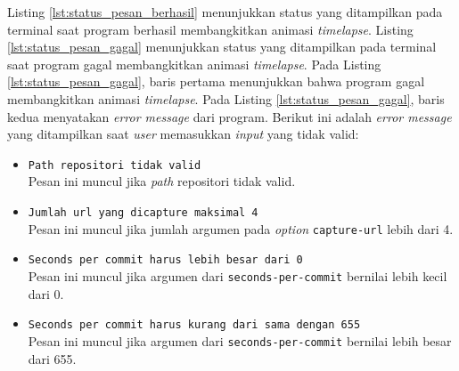 Listing \ref{lst:status_pesan_berhasil} menunjukkan status yang ditampilkan pada terminal saat program berhasil membangkitkan animasi \textit{timelapse}. Listing \ref{lst:status_pesan_gagal} menunjukkan status yang ditampilkan pada terminal saat program gagal membangkitkan animasi \textit{timelapse}. Pada Listing \ref{lst:status_pesan_gagal}, baris pertama menunjukkan bahwa program gagal membangkitkan animasi \textit{timelapse}. Pada Listing \ref{lst:status_pesan_gagal}, baris kedua menyatakan \textit{error message} dari program. Berikut ini adalah \textit{error message} yang ditampilkan saat \textit{user} memasukkan \textit{input} yang tidak valid:
\begin{itemize}
\item \texttt{Path repositori tidak valid}\\
Pesan ini muncul jika \textit{path} repositori tidak valid.
\item \texttt{Jumlah url yang dicapture maksimal 4}\\
Pesan ini muncul jika jumlah argumen pada \textit{option} \texttt{capture-url} lebih dari 4.
\item \texttt{Seconds per commit harus lebih besar dari 0}\\
Pesan ini muncul jika argumen dari \texttt{seconds-per-commit} bernilai lebih kecil dari 0.

\item \texttt{Seconds per commit harus kurang dari sama dengan 655}\\
Pesan ini muncul jika argumen dari \texttt{seconds-per-commit} bernilai lebih besar dari 655.


\end{itemize}
